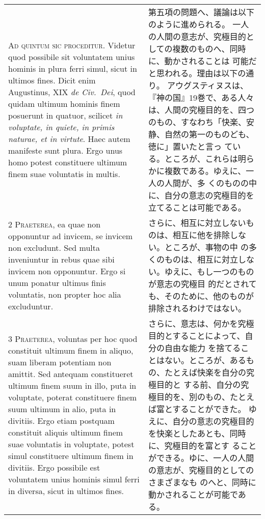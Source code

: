 \documentclass[10pt]{jsarticle} %
\begin{document}
\begin{longtable}{p{21em}p{21em}}

{\Huge A}{\scshape d quintum sic proceditur}. Videtur quod
possibile sit voluntatem unius hominis in plura ferri simul, sicut in
ultimos fines. Dicit enim Augustinus, XIX {\itshape de Civ.~Dei}, quod quidam
ultimum hominis finem posuerunt in quatuor, scilicet {\itshape in voluptate, in
quiete, in primis naturae, et in virtute}. Haec autem manifeste sunt
plura. Ergo unus homo potest constituere ultimum finem suae voluntatis
in multis.


&

第五項の問題へ、議論は以下のように進められる。
一人の人間の意志が、究極目的としての複数のものへ、同時に、動かされることは
 可能だと思われる。理由は以下の通り。
アウグスティヌスは、『神の国』19巻で、ある人々は、人間の究極目的を、四つ
 のもの、すなわち「快楽、安静、自然の第一のものども、徳に」置いたと言っ
 ている。ところが、これらは明らかに複数である。ゆえに、一人の人間が、多
 くのものの中に、自分の意志の究極目的を立てることは可能である。


\\


{\scshape 2 Praeterea}, ea quae non opponuntur ad
invicem, se invicem non excludunt. Sed multa inveniuntur in rebus quae
sibi invicem non opponuntur. Ergo si unum ponatur ultimus finis
voluntatis, non propter hoc alia excluduntur.


&

さらに、相互に対立しないものは、相互に他を排除しない。ところが、事物の中
 の多くのものは、相互に対立しない。ゆえに、もし一つのものが意志の究極目
 的だとされても、そのために、他のものが排除されるわけではない。


\\


{\scshape 3 Praeterea}, voluntas per hoc quod
constituit ultimum finem in aliquo, suam liberam potentiam non
amittit. Sed antequam constitueret ultimum finem suum in illo, puta in
voluptate, poterat constituere finem suum ultimum in alio, puta in
divitiis. Ergo etiam postquam constituit aliquis ultimum finem suae
voluntatis in voluptate, potest simul constituere ultimum finem in
divitiis. Ergo possibile est voluntatem unius hominis simul ferri in
diversa, sicut in ultimos fines.


&

さらに、意志は、何かを究極目的とすることによって、自分の自由な能力
 を捨てることはない。ところが、あるもの、たとえば快楽を自分の究極目的と
 する前、自分の究極目的を、別のもの、たとえば富とすることができた。
ゆえに、自分の意志の究極目的を快楽としたあとも、同時に、究極目的を富とす
 ることができる。ゆに、一人の人間の意志が、究極目的としてのさまざまなも
 のへと、同時に動かされることが可能である。



\end{longtable}
\end{document}
